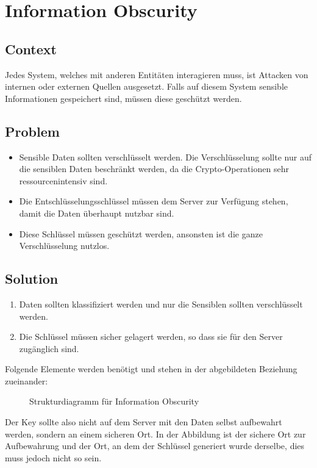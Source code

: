 \chapter{Information Obscurity}

\section{Context}
Jedes System, welches mit anderen Entitäten interagieren muss, ist Attacken von internen oder externen Quellen ausgesetzt. Falls auf diesem System sensible Informationen gespeichert sind, müssen diese geschützt werden.

\section{Problem}
\begin{itemize}
  \item Sensible Daten sollten verschlüsselt werden. Die Verschlüsselung sollte nur auf die sensiblen Daten beschränkt werden, da die Crypto-Operationen sehr ressourcenintensiv sind.
  \item Die Entschlüsselungsschlüssel müssen dem Server zur Verfügung stehen, damit die Daten überhaupt nutzbar sind.
  \item Diese Schlüssel müssen geschützt werden, ansonsten ist die ganze Verschlüsselung nutzlos.
\end{itemize}

\section{Solution}
\begin{enumerate}
  \item Daten sollten klassifiziert werden und nur die Sensiblen sollten verschlüsselt werden.
  \item Die Schlüssel müssen sicher gelagert werden, so dass sie für den Server zugänglich sind.
\end{enumerate}

Folgende Elemente werden benötigt und stehen in der abgebildeten Beziehung zueinander:

\begin{figure}[H]
  \centering
  
  \caption{Strukturdiagramm f\"ur Information Obscurity}
\end{figure}

Der Key sollte also nicht auf dem Server mit den Daten selbst aufbewahrt werden, sondern an einem sicheren Ort. In der Abbildung ist der sichere Ort zur Aufbewahrung und der Ort, an dem der Schlüssel generiert wurde derselbe, dies muss jedoch nicht so sein.

